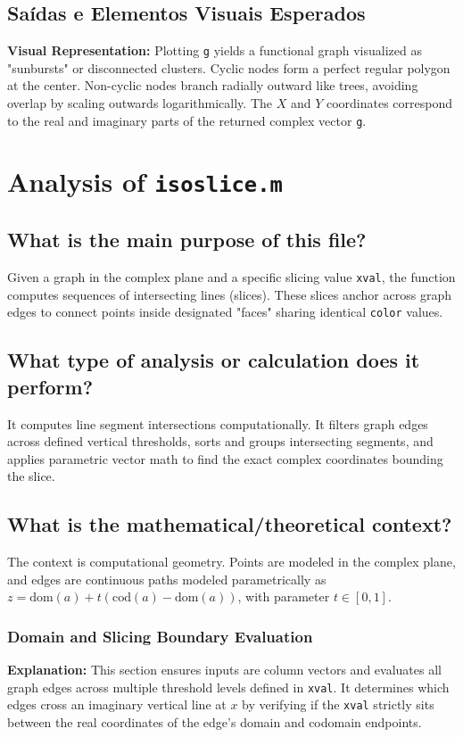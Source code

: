 \section{Saídas e Elementos Visuais Esperados}
\textbf{Visual Representation:} Plotting \texttt{g} yields a functional graph visualized as "sunbursts" or disconnected clusters. Cyclic nodes form a perfect regular polygon at the center. Non-cyclic nodes branch radially outward like trees, avoiding overlap by scaling outwards logarithmically. The $X$ and $Y$ coordinates correspond to the real and imaginary parts of the returned complex vector \texttt{g}.


\newpage
\chapter{Analysis of \texttt{isoslice.m}}

\section{What is the main purpose of this file?}
Given a graph in the complex plane and a specific slicing value \texttt{xval}, the function computes sequences of intersecting lines (slices). These slices anchor across graph edges to connect points inside designated "faces" sharing identical \texttt{color} values.

\section{What type of analysis or calculation does it perform?}
It computes line segment intersections computationally. It filters graph edges across defined vertical thresholds, sorts and groups intersecting segments, and applies parametric vector math to find the exact complex coordinates bounding the slice.

\section{What is the mathematical/theoretical context?}
The context is computational geometry. Points are modeled in the complex plane, and edges are continuous paths modeled parametrically as $z = \text{dom}(a) + t(\text{cod}(a) - \text{dom}(a))$, with parameter $t \in [0, 1]$. 

\subsection{Domain and Slicing Boundary Evaluation}
\textbf{Explanation:} 
This section ensures inputs are column vectors and evaluates all graph edges across multiple threshold levels defined in \texttt{xval}. It determines which edges cross an imaginary vertical line at $x$ by verifying if the \texttt{xval} strictly sits between the real coordinates of the edge's domain and codomain endpoints.

